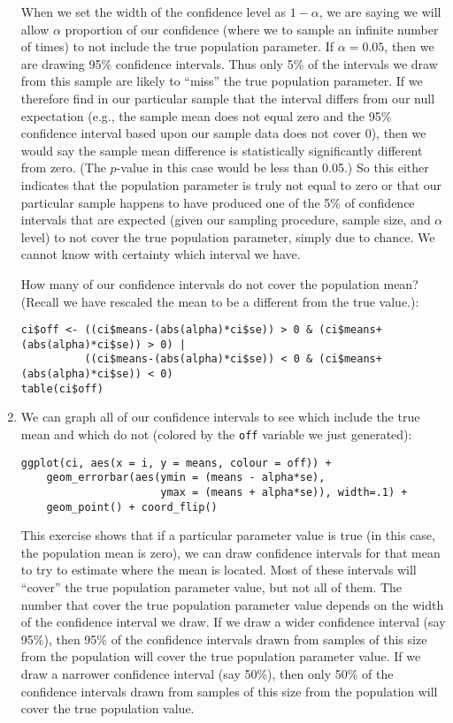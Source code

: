 \documentclass[a4paper,12pt]{article}
\begin{document}
\begin{enumerate}
When we set the width of the confidence level as $1-\alpha$, we are saying we will allow $\alpha$ proportion of our confidence (where we to sample an infinite number of times) to not include the true population parameter. If $\alpha = 0.05$, then we are drawing 95\% confidence intervals. Thus only 5\% of the intervals we draw from this sample are likely to ``miss'' the true population parameter. If we therefore find in our particular sample that the interval differs from our null expectation (e.g., the sample mean does not equal zero and the 95\% confidence interval based upon our sample data does not cover 0), then we would say the sample mean difference is statistically significantly different from zero. (The $p$-value in this case would be less than 0.05.) So this either indicates that the population parameter is truly not equal to zero or that our particular sample happens to have produced one of the 5\% of confidence intervals that are expected (given our sampling procedure, sample size, and $\alpha$ level) to not cover the true population parameter, simply due to chance. We cannot know with certainty which interval we have.

How many of our confidence intervals do not cover the population mean? (Recall we have rescaled the mean to be a different from the true value.):

\begin{verbatim}
ci$off <- ((ci$means-(abs(alpha)*ci$se)) > 0 & (ci$means+(abs(alpha)*ci$se)) > 0) | 
          ((ci$means-(abs(alpha)*ci$se)) < 0 & (ci$means+(abs(alpha)*ci$se)) < 0)
table(ci$off)
\end{verbatim}
 
\item We can graph all of our confidence intervals to see which include the true mean and which do not (colored by the \texttt{off} variable we just generated):

\begin{verbatim}
ggplot(ci, aes(x = i, y = means, colour = off)) + 
    geom_errorbar(aes(ymin = (means - alpha*se), 
                      ymax = (means + alpha*se)), width=.1) + 
    geom_point() + coord_flip()
\end{verbatim}

\noindent This exercise shows that if a particular parameter value is true (in this case, the population mean is zero), we can draw confidence intervals for that mean to try to estimate where the mean is located. Most of these intervals will ``cover'' the true population parameter value, but not all of them. The number that cover the true population parameter value depends on the width of the confidence interval we draw. If we draw a wider confidence interval (say 95\%), then 95\% of the confidence intervals drawn from samples of this size from the population will cover the true population parameter value. If we draw a narrower confidence interval (say 50\%), then only 50\% of the confidence intervals drawn from samples of this size from the population will cover the true population value. 


\end{enumerate}
\end{document}

